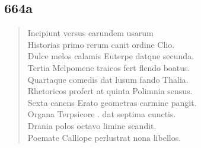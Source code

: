\documentclass[11pt, a4paper]{report}
\begin{document}
            \subsection*{664a}
      \begin{verse}
      Ineipiunt versus earundem usarum \\ Historias primo rerum canit ordine Clio. \\ Dulce melos calamis Euterpe datqne secunda. \\ Tertia Melpomene traicos fert flendo boatus. \\ Quartaque comedis dat lusum fando Thalia. \\ Rhetoricos profert at quinta Polimnia sensus. \\ Sexta canens Erato geometras carmine pangit. \\ Organa Terpsicore . dat septima cunctis. \\ Drania polos octavo limine scandit. \\ Poemate Calliope perlustrat nona libellos. \\ 
      \end{verse}
  
\end{document}
